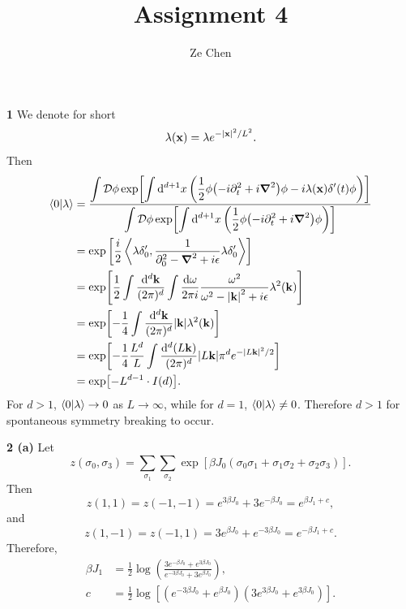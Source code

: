 \documentclass{article}
\title{Assignment 4}
\author{Ze Chen}
\makeatletter
\newcommand*{\shifttext}[1]{%
  \settowidth{\@tempdima}{#1}%
  \hspace{-\@tempdima}#1%
}
\newcommand{\plabel}[1]{%
\shifttext{\textbf{#1}\quad}%
}
\newcommand{\prule}{%
\begin{center}%
\hdashrule[0.5ex]{.99\linewidth}{1pt}{1pt 2.5pt}%
\end{center}%
}
\makeatother
\begin{document}
\maketitle

\plabel{1}%
We denote for short
\[ \lambda(\vb{x}) = \lambda e^{-\abs{\vb{x}}^2/L^2}. \]
Then
\begin{align*}
    \bra{0}\ket{\lambda} &= \frac{\displaystyle\int \mathcal{D}\phi \exp[\int \dd[d+1]{x} \qty(\frac{1}{2}\phi\qty(-i\partial_t^2 + i\grad^2)\phi - i\lambda(\vb{x})\delta'(t)\phi)]}{\displaystyle \int \mathcal{D}\phi \exp[\int \dd[d+1]{x} \qty(\frac{1}{2}\phi\qty(-i\partial_t^2 + i\grad^2)\phi)]} \\
    &= \exp\qty[\frac{i}{2} \left< \lambda \delta'_0, \frac{1}{\partial_0^2 - \grad^2+i\epsilon} \lambda \delta'_0 \right>] \\
    &= \exp[\frac{1}{2} \int \frac{\dd[d]{\vb{k}}}{(2\pi)^d} \int \frac{\dd{\omega}}{2\pi i} \frac{\omega^2}{\omega^2 - \abs{\vb{k}}^2 + i\epsilon}\lambda^2(\vb{k})] \\
    &= \exp[-\frac{1}{4} \int \frac{\dd[d]{\vb{k}}}{(2\pi)^d} \abs{\vb{k}} \lambda^2(\vb{k})] \\
    &= \exp[-\frac{1}{4} \frac{L^d}{L} \int \frac{\dd[d]{(L\vb{k})}}{(2\pi)^d} \abs{L\vb{k}} \pi^{d} e^{-\abs{L\vb{k}}^2/2}] \\
    &= \exp[-L^{d-1} \cdot I(d)].
\end{align*}
For $d>1$, $\bra{0}\ket{\lambda} \rightarrow 0$ as $L\rightarrow \infty$, while for $d=1$, $\bra{0}\ket{\lambda} \neq 0$.
Therefore $d>1$ for spontaneous symmetry breaking to occur.

\prule

\plabel{2 (a)}%
Let
\[ z(\sigma_0,\sigma_3) = \sum_{\sigma_1}\sum_{\sigma_2} \exp[\beta J_0(\sigma_0 \sigma_1 + \sigma_1 \sigma_2 + \sigma_2 \sigma_3)]. \]
Then
\[ z(1,1) = z(-1,-1) = e^{3\beta J_0} + 3e^{-\beta J_0} = e^{\beta J_1 + c}, \]
and
\[ z(1,-1) = z(-1,1) = 3e^{\beta J_0} + e^{-3\beta J_0} = e^{-\beta J_1 + c}. \]
Therefore,
\begin{align*}
    \beta J_1 &= \frac{1}{2} \log(\frac{3e^{-\beta J_0} + e^{3\beta J_0}}{e^{-3\beta J_0} + 3e^{\beta J_0}}), \\
    c &= \frac{1}{2}\log[(e^{-3\beta J_0} + e^{\beta J_0})(3e^{3\beta J_0} + e^{3\beta J_0})].
\end{align*}
\end{document}
